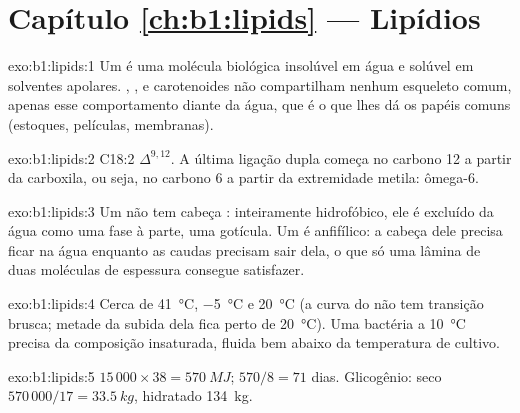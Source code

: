 \section*{Capítulo \ref{ch:b1:lipids} --- Lipídios}

\begin{solution}{exo:b1:lipids:1}
Um  é uma molécula biológica insolúvel em água e solúvel em
solventes apolares. , ,  e carotenoides não
compartilham nenhum esqueleto comum, apenas esse comportamento diante da
água, que é o que lhes dá os papéis comuns (estoques, películas,
membranas).
\end{solution}

\begin{solution}{exo:b1:lipids:2}
C18:2 $\Delta^{9,12}$. A última ligação dupla começa no carbono 12 a
partir da carboxila, ou seja, no carbono 6 a partir da extremidade
metila: ômega-6.
\end{solution}

\begin{solution}{exo:b1:lipids:3}
Um  não tem cabeça : inteiramente hidrofóbico, ele é
excluído da água como uma fase à parte, uma gotícula. Um  é
anfifílico: a cabeça  dele precisa ficar na água enquanto as caudas
precisam sair dela, o que só uma lâmina de duas moléculas de espessura
consegue satisfazer.
\end{solution}

\begin{solution}{exo:b1:lipids:4}
Cerca de \qty{41}{\celsius}, \qty{-5}{\celsius} e \qty{20}{\celsius} (a
curva do  não tem transição brusca; metade da subida dela fica
perto de \qty{20}{\celsius}). Uma bactéria a \qty{10}{\celsius} precisa
da composição insaturada, fluida bem abaixo da temperatura de cultivo.
\end{solution}

\begin{solution}{exo:b1:lipids:5}
$15\,000\times 38 = \qty{570}{MJ}$; $570/8 = 71$ dias. Glicogênio: seco
$570\,000/17 = \qty{33.5}{kg}$, hidratado \qty{134}{kg}.
\end{solution}

